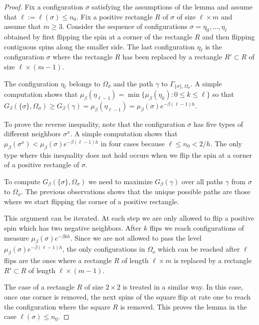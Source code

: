 \documentclass[reqno]{amsart}
\begin{document}
\begin{proof}
Fix a configuration $\sigma$ satisfying the assumptions of the lemma
and assume that $\ell :=\ell(\sigma) \le n_0$. Fix a positive
rectangle $R$ of $\sigma$ of size $\ell \times m$ and assume that
$m\ge 3$. Consider the sequence of configurations $\sigma = \eta_0,
\dots, \eta_\ell$ obtained by first flipping the spin at a corner of
the rectangle $R$ and then flipping contiguous spins along the smaller
side. The last configuration $\eta_\ell$ is the configuration $\sigma$
where the rectangle $R$ has been replaced by a rectangle $R'\subset R$
of size $\ell \times (m-1)$.

The configuration $\eta_\ell$ belongs to $\Omega_\sigma$ and the path
$\gamma$ to $\Gamma_{\{\sigma\} , \Omega_\sigma}$. A simple
computation shows that $\mu_\beta(\eta_{\ell-1}) =
\min\{\mu_\beta(\eta_k) : 0\le k\le \ell\}$ so that
$G_\beta(\{\sigma\} , \Omega_\sigma) \ge G_\beta(\gamma) =
\mu_\beta(\eta_{\ell-1}) = \mu_\beta(\sigma) e^{-\beta (\ell-1)h}$.

To prove the reverse inequality, note that the configuration $\sigma$
has five types of different neighbors $\sigma^x$. A simple computation
shows that $\mu_\beta(\sigma^x) < \mu_\beta(\sigma) e^{-\beta
  (\ell-1)h}$ in four cases because $\ell \le n_0 < 2/h$. The only
type where this inequality does not hold occurs when we flip the spin
at a corner of a positive rectangle of $\sigma$.

To compute $G_\beta(\{\sigma\} , \Omega_\sigma)$ we need to maximize
$G_\beta(\gamma)$ over all paths $\gamma$ from $\sigma$ to
$\Omega_\sigma$. The previous observations shows that the unique
possible paths are those where we start flipping the corner of a
positive rectangle.

This argument can be iterated. At each step we are only allowed to
flip a positive spin which has two negative neighbors. After $k$ flips
we reach configurations of measure $\mu_\beta(\sigma) e^{-\beta k
  h}$. Since we are not allowed to pass the level $\mu_\beta(\sigma)
e^{-\beta (\ell-1)h}$, the only configurations in $\Omega_o$ which can
be reached after $\ell$ flips are the ones where a rectangle $R$ of
length $\ell \times m$ is replaced by a rectangle $R'\subset R$ of
length $\ell \times (m-1)$.

The case of a rectangle $R$ of size $2\times 2$ is treated in a
similar way. In this case, once one corner is removed, the next spins
of the square flip at rate one to reach the configuration where the
square $R$ is removed. This proves the lemma in the case $\ell
(\sigma) \le n_0$.


\end{proof}
\end{document}
